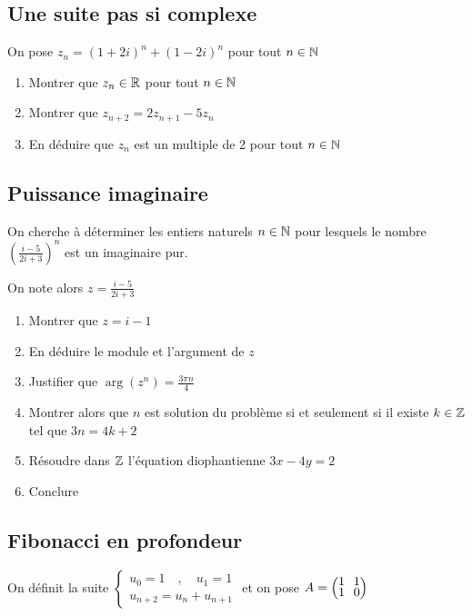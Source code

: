 \documentclass[oneside,12pt]{book}          %
\begin{document}
\subsection{Une suite pas si complexe}
On pose $z_n=(1+2i)^n+(1-2i)^n$ pour tout ${n\in\mathbb N}$
\begin{enumerate}
    \item Montrer que $z_n\in{\mathbb R}$ pour tout ${n\in\mathbb N}$
    \item Montrer que $z_{n+2}=2z_{n+1}-5z_n$
    \item En déduire que $z_n$ est un multiple de 2 pour tout ${n\in\mathbb N}$
\end{enumerate}



\subsection{Puissance imaginaire}
On cherche à déterminer les entiers naturels ${n\in\mathbb N}$ pour lesquels le nombre $\left(\frac{i-5}{2i+3}\right)^n$ est un imaginaire pur.

On note alors $z=\frac{i-5}{2i+3}$
\begin{enumerate}
    \item Montrer que $z=i-1$
    \item En déduire le module et l'argument de $z$
    \item Justifier que $\arg\left(z^n\right)=\frac{3\pi n}{4}$
    \item Montrer alors que $n$ est solution du problème si et seulement si il existe $k\in{\mathbb Z}$ tel que $3n=4k+2$
    \item Résoudre dans ${\mathbb Z}$ l'équation diophantienne $3x-4y=2$
    \item Conclure
\end{enumerate}



\subsection{Fibonacci en profondeur}
On définit la suite $\begin{cases}u_0=1\quad,\quad u_1=1\\u_{n+2}=u_n+u_{n+1}\end{cases}$ \quad et on pose $A=\matrice{1&1\\1&0}$
\end{document}
